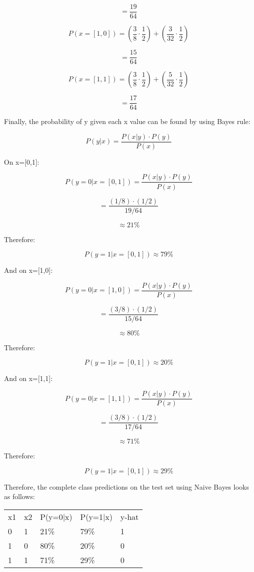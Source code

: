\documentclass{article}
\begin{document}
$$ = \frac{19}{64} $$

$$ P(x = [1,0]) = \left(\frac{3}{8} \cdot \frac{1}{2}\right) + \left(\frac{3}{32} \cdot \frac{1}{2}\right) $$

$$ = \frac{15}{64} $$

$$ P(x = [1,1]) = \left(\frac{3}{8} \cdot \frac{1}{2}\right) + \left(\frac{5}{32} \cdot \frac{1}{2}\right) $$

$$ = \frac{17}{64} $$

Finally, the probability of y given each x value can be found by using Bayes rule:

$$ P(y|x) = \frac{P(x|y) \cdot P(y)}{P(x)} $$

On x=[0,1]:

$$ P(y=0|x=[0,1]) = \frac{P(x|y) \cdot P(y)}{P(x)} $$

$$ = \frac{(1/8) \cdot (1/2)}{19/64} $$

$$ \approx 21\% $$

Therefore:

$$ P(y=1|x=[0,1]) \approx 79\% $$

And on x=[1,0]:

$$ P(y=0|x=[1,0]) = \frac{P(x|y) \cdot P(y)}{P(x)} $$

$$ = \frac{(3/8) \cdot (1/2)}{15/64} $$

$$ \approx 80\% $$

Therefore:

$$ P(y=1|x=[0,1]) \approx 20\% $$

And on x=[1,1]:

$$ P(y=0|x=[1,1]) = \frac{P(x|y) \cdot P(y)}{P(x)} $$

$$ = \frac{(3/8) \cdot (1/2)}{17/64} $$

$$ \approx 71\% $$

Therefore:

$$ P(y=1|x=[0,1]) \approx 29\% $$

Therefore, the complete class predictions on the test set using Naive Bayes looks as follows:
\begin{table}[h]
\begin{tabular}{lllll}
  x1  &  x2  &  P(y=0|x)  &  P(y=1|x)  &  y-hat \\
   0  &   1  &     21\%    &     79\%    &    1 \\
   1  &   0  &     80\%    &     20\%    &    0 \\
   1  &   1  &     71\%    &     29\%    &    0
\end{tabular}
\end{table}
\end{document}
